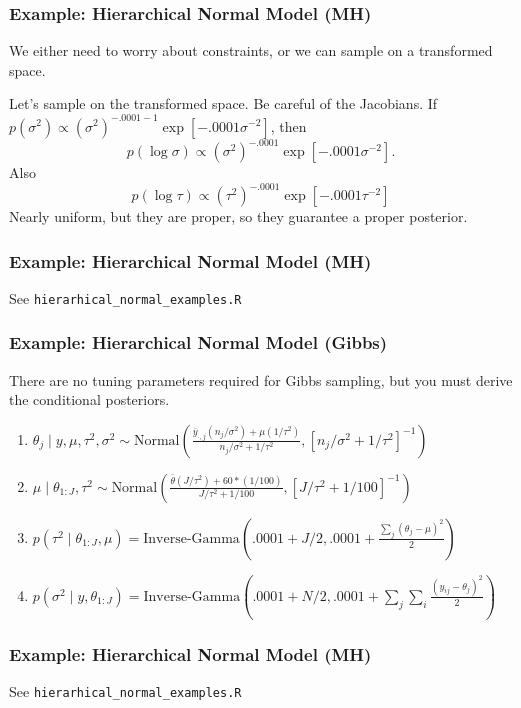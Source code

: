 \documentclass{beamer}
\begin{document}
\begin{frame}
\frametitle{Example: Hierarchical Normal Model (MH)}

We either need to worry about constraints, or we can sample on a transformed space.
\newline

Let's sample on the transformed space. Be careful of the Jacobians. If $p(\sigma^2) \propto (\sigma^2)^{-.0001-1}\exp\left[- .0001 \sigma^{-2} \right]$, then
$$
p(\log \sigma) \propto (\sigma^2)^{-.0001}\exp\left[- .0001 \sigma^{-2} \right] .
$$
Also
$$
p(\log \tau) \propto (\tau^2)^{-.0001}\exp\left[- .0001 \tau^{-2} \right]
$$
Nearly uniform, but they are proper, so they guarantee a proper posterior. 

\end{frame}

\begin{frame}[fragile]
\frametitle{Example: Hierarchical Normal Model (MH)}

See \verb|hierarhical_normal_examples.R|
\end{frame}

\begin{frame}
\frametitle{Example: Hierarchical Normal Model (Gibbs)}

There are no tuning parameters required for Gibbs sampling, but you must derive the conditional posteriors. 
\newline

\begin{enumerate}
\item $\theta_j \mid y, \mu, \tau^2, \sigma^2  \sim \text{Normal}\left(\frac{\bar{y}_{\cdot,j} (n_j/\sigma^2) + \mu(1/\tau^2) }{n_j/\sigma^2 + 1/\tau^2} ,[n_j/\sigma^2 + 1/\tau^2]^{-1} \right)$
\item $\mu \mid \theta_{1:J}, \tau^2 \sim \text{Normal}\left(\frac{\bar{\theta} (J/\tau^2) + 60*(1/100) }{J/\tau^2 + 1/100} ,[J/\tau^2 + 1/100]^{-1} \right)$
\item $p(\tau^2 \mid \theta_{1:J}, \mu) = \text{Inverse-Gamma}(.0001 + J/2, .0001  +  \frac{\sum_j (\theta_j - \mu)^2}{2})$
\item  $p(\sigma^2 \mid y, \theta_{1:J}) =  \text{Inverse-Gamma}(.0001 + N/2 ,.0001 + \sum_j \sum_i \frac{(y_{ij} - \theta_j)^2}{2 })$
\end{enumerate}

\end{frame}
\begin{frame}[fragile]
\frametitle{Example: Hierarchical Normal Model (MH)}

See \verb|hierarhical_normal_examples.R|
\end{frame}
\end{document}
